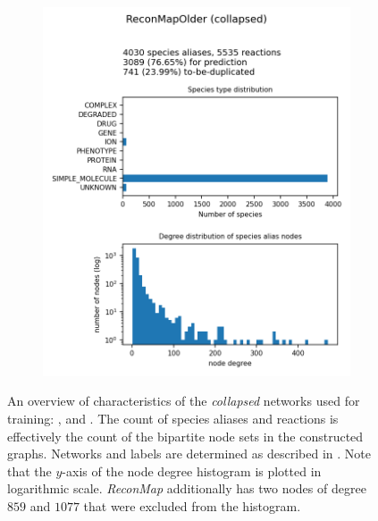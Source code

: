 \documentclass[
	fontsize=10pt, %
	twoside=true, %
	secnumdepth=1, %
  toc=indentunnumbered %
]{kaobook}
\begin{document}
\begin{figure}[h]
\begin{subfigure}{0.32\textwidth}
  \end{subfigure} 
  \begin{subfigure}{0.32\textwidth}
    \includegraphics[width=\linewidth]{generated/ReconMapOlder.png}
  \end{subfigure} 
  \caption{An
    overview of characteristics of the \textit{collapsed} networks used for
    training: \ADLast{}, \PDMap{} and \ReconMap{}. The count of species aliases
    and reactions is effectively the count of the bipartite node sets in the
    constructed graphs.
    Networks and labels are
    determined as described in . Note that the $y$-axis of the
    node degree histogram is plotted in logarithmic scale. \textit{ReconMap}
    additionally has two nodes of degree $859$ and $1077$ that were excluded
    from the histogram. }
  \label{fig:maps-summary}
\end{figure}

\end{document}
